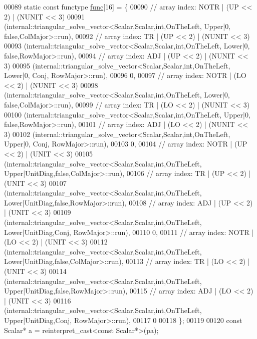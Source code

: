 \begin{DoxyCode}
00089   \textcolor{keyword}{static} \textcolor{keyword}{const} functype \hyperlink{structfunc}{func}[16] = \{
00090     \textcolor{comment}{// array index: NOTR  | (UP << 2) | (NUNIT << 3)}
00091     (internal::triangular\_solve\_vector<Scalar,Scalar,int,OnTheLeft, Upper|0,       false,ColMajor>::run),
00092     \textcolor{comment}{// array index: TR    | (UP << 2) | (NUNIT << 3)}
00093     (internal::triangular\_solve\_vector<Scalar,Scalar,int,OnTheLeft, Lower|0,       false,RowMajor>::run),
00094     \textcolor{comment}{// array index: ADJ   | (UP << 2) | (NUNIT << 3)}
00095     (internal::triangular\_solve\_vector<Scalar,Scalar,int,OnTheLeft, Lower|0,       Conj, RowMajor>::run),
00096     0,
00097     \textcolor{comment}{// array index: NOTR  | (LO << 2) | (NUNIT << 3)}
00098     (internal::triangular\_solve\_vector<Scalar,Scalar,int,OnTheLeft, Lower|0,       false,ColMajor>::run),
00099     \textcolor{comment}{// array index: TR    | (LO << 2) | (NUNIT << 3)}
00100     (internal::triangular\_solve\_vector<Scalar,Scalar,int,OnTheLeft, Upper|0,       false,RowMajor>::run),
00101     \textcolor{comment}{// array index: ADJ   | (LO << 2) | (NUNIT << 3)}
00102     (internal::triangular\_solve\_vector<Scalar,Scalar,int,OnTheLeft, Upper|0,       Conj, RowMajor>::run),
00103     0,
00104     \textcolor{comment}{// array index: NOTR  | (UP << 2) | (UNIT  << 3)}
00105     (internal::triangular\_solve\_vector<Scalar,Scalar,int,OnTheLeft, Upper|UnitDiag,false,ColMajor>::run),
00106     \textcolor{comment}{// array index: TR    | (UP << 2) | (UNIT  << 3)}
00107     (internal::triangular\_solve\_vector<Scalar,Scalar,int,OnTheLeft, Lower|UnitDiag,false,RowMajor>::run),
00108     \textcolor{comment}{// array index: ADJ   | (UP << 2) | (UNIT  << 3)}
00109     (internal::triangular\_solve\_vector<Scalar,Scalar,int,OnTheLeft, Lower|UnitDiag,Conj, RowMajor>::run),
00110     0,
00111     \textcolor{comment}{// array index: NOTR  | (LO << 2) | (UNIT  << 3)}
00112     (internal::triangular\_solve\_vector<Scalar,Scalar,int,OnTheLeft, Lower|UnitDiag,false,ColMajor>::run),
00113     \textcolor{comment}{// array index: TR    | (LO << 2) | (UNIT  << 3)}
00114     (internal::triangular\_solve\_vector<Scalar,Scalar,int,OnTheLeft, Upper|UnitDiag,false,RowMajor>::run),
00115     \textcolor{comment}{// array index: ADJ   | (LO << 2) | (UNIT  << 3)}
00116     (internal::triangular\_solve\_vector<Scalar,Scalar,int,OnTheLeft, Upper|UnitDiag,Conj, RowMajor>::run),
00117     0
00118   \};
00119 
00120   \textcolor{keyword}{const} Scalar* a = \textcolor{keyword}{reinterpret\_cast<}\textcolor{keyword}{const }Scalar*\textcolor{keyword}{>}(pa);

\end{DoxyCode}
